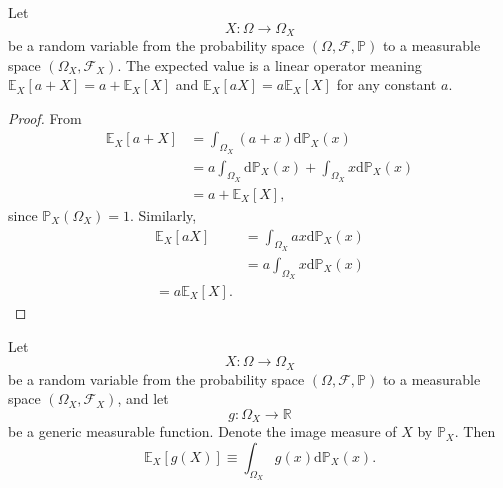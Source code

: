\begin{theorem}
	\label{theorem:exp_linear}
	Let 
	\begin{equation}
		X\colon \Omega \to \Omega_X
	\end{equation}
	be a random variable from the probability space $(\Omega, \mathcal{F}, \mathbb{P})$ to a measurable space $(\Omega_X, \mathcal{F}_X)$. The expected value is a linear operator meaning $\mathbb{E}_X[a+X] = a+\mathbb{E}_X[X]$ and $\mathbb{E}_X[aX] = a\mathbb{E}_X[X]$ for any constant $a$.
\end{theorem}
\begin{proof}
	From  
	\begin{equation}
		\begin{split}
			\mathbb{E}_X[a + X] &= \int_{\Omega_X}(a + x) \mathrm{d}\mathbb{P}_X(x) \\ 
			&= a\int_{\Omega_X} \mathrm{d}\mathbb{P}_X(x) + \int_{\Omega_X} x \mathrm{d}\mathbb{P}_X(x)\\
			&= a + \mathbb{E}_X[X],
		\end{split}
	\end{equation}
	since $\mathbb{P}_X(\Omega_X) = 1$. Similarly,
	\begin{equation}
		\begin{split}
			\mathbb{E}_X[a X] &= \int_{\Omega_X} a x \mathrm{d}\mathbb{P}_X(x) \\
			& = a \int_{\Omega_X} x \mathrm{d}\mathbb{P}_X(x)\\
			 = a \mathbb{E}_X[X].
		\end{split}
	\end{equation}
\end{proof}

\begin{remark}
	\label{th:lotus}
	Let 
	\begin{equation}
		X\colon \Omega \to \Omega_X
	\end{equation}
	be a random variable from the probability space $(\Omega, \mathcal{F}, \mathbb{P})$ to a measurable space $(\Omega_X, \mathcal{F}_X)$, and let 
	\begin{equation}
		g\colon \Omega_X \to \mathbb{R}
	\end{equation} 
	be a generic measurable function. Denote the image measure of $X$ by $\mathbb{P}_X $. Then
	\begin{equation}
		\mathbb{E}_X[g(X)] \equiv \int_{\Omega_X} g(x)\mathrm{d}\mathbb{P}_X(x).
		\label{eq:lotus_image}
	\end{equation}
\end{remark}

